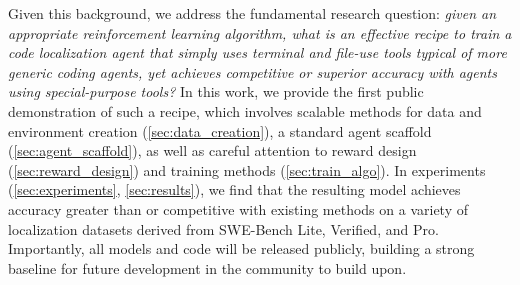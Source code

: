 Given this background, we address the fundamental research question: \emph{given an appropriate reinforcement learning algorithm, what is an effective recipe to train a code localization agent that simply uses terminal and file-use tools typical of more generic coding agents, yet achieves competitive or superior accuracy with agents using special-purpose tools?}
In this work, we provide the first public demonstration of such a recipe, which involves scalable methods for data and environment creation (\autoref{sec:data_creation}), a standard agent scaffold (\autoref{sec:agent_scaffold}), as well as careful attention to reward design (\autoref{sec:reward_design}) and training methods (\autoref{sec:train_algo}).
In experiments (\autoref{sec:experiments}, \autoref{sec:results}), we find that the resulting model \methodname achieves accuracy greater than or competitive with existing methods on a variety of localization datasets derived from SWE-Bench Lite, Verified, and Pro.
Importantly, all models and code will be released publicly, building a strong baseline for future development in the community to build upon.



    

